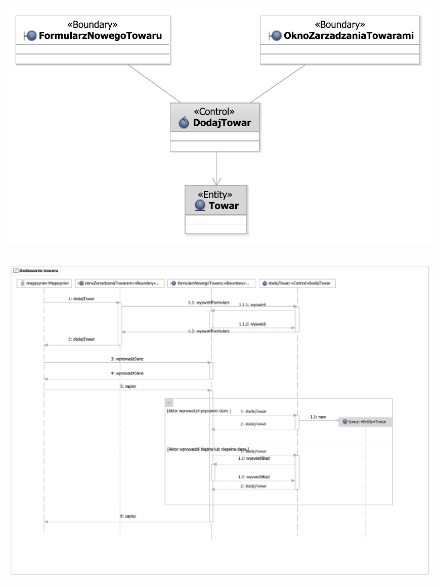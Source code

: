 \begin{figure}[H]
  \centering
  \includegraphics[angle=\ecbangle, scale=\ecbscale]{../img/usecase/pu19ecb.pdf}
  \caption{}
\end{figure}

\begin{figure}[H]
  \centering
  \includegraphics[angle=\seqangle, scale=0.5]{../img/usecase/pu19seq.pdf}
  \caption{}
\end{figure}
\newpage

